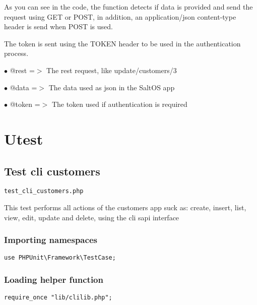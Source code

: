 \documentclass[a4paper]{article}
\begin{document}
As you can see in the code, the function detects if data is provided and send the request
using GET or POST, in addition, an application/json content-type header is send when POST
is used.

The token is sent using the TOKEN header to be used in the authentication process.

\begin{compactitem}
\item[\color{myblue}$\bullet$] @rest  =$>$ The rest request, like update/customers/3
\item[\color{myblue}$\bullet$] @data  =$>$ The data used as json in the SaltOS app
\item[\color{myblue}$\bullet$] @token =$>$ The token used if authentication is required
\end{compactitem}


\hypertarget{toc8}{}
\section{Utest}

\hypertarget{toc9}{}
\subsection{Test cli customers}

\begin{lstlisting}
test_cli_customers.php
\end{lstlisting}

This test performs all actions of the customers app suck as: create, insert,
list, view, edit, update and delete, using the cli sapi interface

\hypertarget{toc10}{}
\subsubsection{Importing namespaces}

\begin{lstlisting}
use PHPUnit\Framework\TestCase;
\end{lstlisting}

\hypertarget{toc11}{}
\subsubsection{Loading helper function}

\begin{lstlisting}
require_once "lib/clilib.php";
\end{lstlisting}
\end{document}

